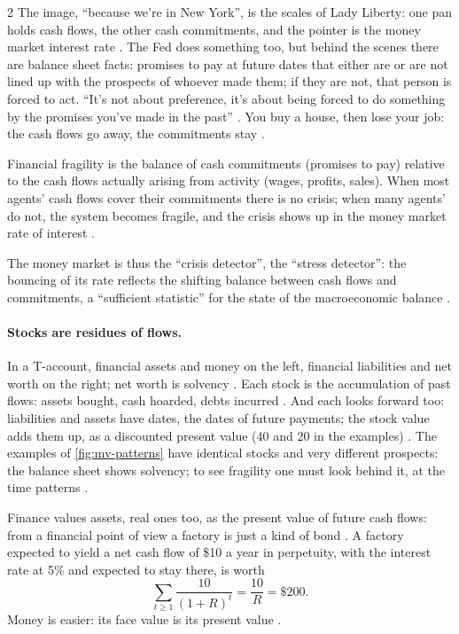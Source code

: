 \begin{paracol}{2}
The image, ``because we're in New York'', is the scales of Lady Liberty: one pan holds cash flows, the other cash commitments, and the
pointer is the money market interest rate . The Fed does something too, but behind the scenes there are
balance sheet facts: promises to pay at future dates that either are or are not lined up with the prospects of whoever made them; if they are
not, that person is forced to act. ``It's not about preference, it's about being forced to do something by the promises you've made in the
past'' . You buy a house, then lose your job: the cash flows go away, the commitments stay .

\begin{proposition}\label{prop:mv-fragility}
Financial fragility is the balance of cash commitments (promises to pay) relative to the cash flows actually arising from activity
(wages, profits, sales). When most agents' cash flows cover their commitments there is no crisis; when many agents' do not, the system
becomes fragile, and the crisis shows up in the money market rate of interest .
\end{proposition}

The money market is thus the ``crisis detector'', the ``stress detector'': the bouncing of its rate reflects the shifting balance between cash
flows and commitments, a ``sufficient statistic'' for the state of the macroeconomic balance .

\paragraph{Stocks are residues of flows.} In a T-account, financial assets and money on the left, financial liabilities and net worth on the
right; net worth is solvency . Each stock is the accumulation of past flows: assets bought, cash hoarded, debts
incurred . And each looks forward too: liabilities and assets have dates, the dates of future payments; the stock
value adds them up, as a discounted present value (40 and 20 in the examples) . The examples of \cref{fig:mv-patterns} have
identical stocks and very different prospects: the balance sheet shows solvency; to see fragility one must look behind it, at the time
patterns .

\begin{example}
Finance values assets, real ones too, as the present value of future cash flows: from a financial point of view a factory is just a kind of bond
. A factory expected to yield a net cash flow of \$10 a year in perpetuity, with the interest rate at 5\% and expected to stay there, is
worth
\[
  \sum_{t\ge1}\frac{10}{(1+R)^t} = \frac{10}{R} = \$200 .
\]
Money is easier: its face value is its present value .
\end{example}


\end{paracol}
